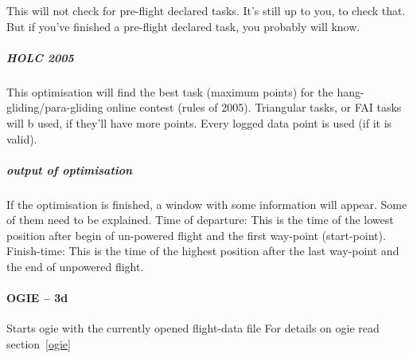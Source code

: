 This will not check for pre-flight declared tasks. It's still up to you, to check that. But if you've finished a pre-flight declared task, you probably will know.


\subparagraph{HOLC 2005}
This optimisation will find the best task (maximum points)  for the hang-gliding/para-gliding online contest (rules of 2005). Triangular
tasks, or FAI tasks will b used, if they'll have more points. Every logged data point is used (if it is valid).


\subparagraph{output of optimisation} If the optimisation is finished, a window with some information will appear.
Some of them need to be explained. Time of departure: This is the time of the lowest position after begin of un-powered flight and the first way-point (start-point). Finish-time: This is the time of the highest position after the last way-point and the end of unpowered flight.


\paragraph{OGIE -- 3d}
Starts ogie with the currently opened flight-data file
For details on ogie read section~\ref{ogie}





